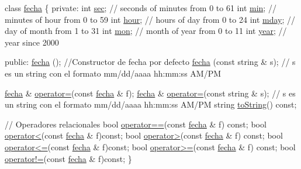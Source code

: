 \begin{DoxyCode}
\textcolor{keyword}{class }\hyperlink{classfecha}{fecha} \{
\textcolor{keyword}{private}:
  \textcolor{keywordtype}{int}  \hyperlink{classfecha_a09eb9f4865c9ff896f438b8df3cf6485}{sec};   \textcolor{comment}{// seconds of minutes from 0 to 61}
  \textcolor{keywordtype}{int}  \hyperlink{classfecha_a3875f28ff6e7c383923c80e86afaec2e}{min};   \textcolor{comment}{// minutes of hour from 0 to 59}
  \textcolor{keywordtype}{int}  \hyperlink{classfecha_a895a2cc9dd11326a8392a4c6fc928a14}{hour};  \textcolor{comment}{// hours of day from 0 to 24}
  \textcolor{keywordtype}{int}  \hyperlink{classfecha_a9c1dc50e5f5efcd3e30a981bfd495b1d}{mday};  \textcolor{comment}{// day of month from 1 to 31}
  \textcolor{keywordtype}{int}  \hyperlink{classfecha_a5c86be74f1215600f99798d54126ba16}{mon};   \textcolor{comment}{// month of year from 0 to 11}
  \textcolor{keywordtype}{int}  \hyperlink{classfecha_a4d06534f05a6350ae229ce2b17b860e8}{year};  \textcolor{comment}{// year since 2000}

\textcolor{keyword}{public}:
 \hyperlink{classfecha_a6775ef84b5838e12e28fd341793f4539}{fecha} (); \textcolor{comment}{//Constructor de fecha por defecto}
 \hyperlink{classfecha_a6775ef84b5838e12e28fd341793f4539}{fecha} (\textcolor{keyword}{const} \textcolor{keywordtype}{string} & s); \textcolor{comment}{// s es un string con el formato mm/dd/aaaa  hh:mm:ss AM/PM}

 \hyperlink{classfecha}{fecha} & \hyperlink{classfecha_aeb5a68104e936f98eb933b4d6856f841}{operator=}(\textcolor{keyword}{const} \hyperlink{classfecha}{fecha} & f);
 \hyperlink{classfecha}{fecha} & \hyperlink{classfecha_aeb5a68104e936f98eb933b4d6856f841}{operator=}(\textcolor{keyword}{const} \textcolor{keywordtype}{string} & s); \textcolor{comment}{// s es un string con el formato mm/dd/aaaa hh:mm:ss
       AM/PM}
 \textcolor{keywordtype}{string} \hyperlink{classfecha_a26d22b980284408eac0da084f358c43b}{toString}() \textcolor{keyword}{const};

\textcolor{comment}{// Operadores relacionales}
  \textcolor{keywordtype}{bool} \hyperlink{classfecha_ac971e131a6e3edf57c2313468524f364}{operator==}(\textcolor{keyword}{const} \hyperlink{classfecha}{fecha} & f) \textcolor{keyword}{const};
 \textcolor{keywordtype}{bool} \hyperlink{classfecha_a27803300b9698e1a40ef48f2009948c5}{operator<}(\textcolor{keyword}{const} \hyperlink{classfecha}{fecha} & f)\textcolor{keyword}{const};
 \textcolor{keywordtype}{bool} \hyperlink{classfecha_aaded7646e80d88492b31b17b4fb001fd}{operator>}(\textcolor{keyword}{const} \hyperlink{classfecha}{fecha} & f) \textcolor{keyword}{const};
 \textcolor{keywordtype}{bool} \hyperlink{classfecha_a8dfb2f2a7424bdb1dacc6df122b0a0c8}{operator<=}(\textcolor{keyword}{const} \hyperlink{classfecha}{fecha} & f)\textcolor{keyword}{const};
 \textcolor{keywordtype}{bool} \hyperlink{classfecha_a98d0f3009cb7205b5ddb3b81596d9cc7}{operator>=}(\textcolor{keyword}{const} \hyperlink{classfecha}{fecha} & f) \textcolor{keyword}{const};
 \textcolor{keywordtype}{bool} \hyperlink{classfecha_a1f6d28759c45b138efb80d25a7c398b8}{operator!=}(\textcolor{keyword}{const} \hyperlink{classfecha}{fecha} & f)\textcolor{keyword}{const};
\}


\end{DoxyCode}
